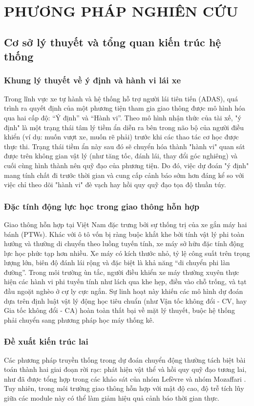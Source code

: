 \chapter{PHƯƠNG PHÁP NGHIÊN CỨU}
	\section{Cơ sở lý thuyết và tổng quan kiến trúc hệ thống}
	
	\subsection{Khung lý thuyết về ý định và hành vi lái xe}
	Trong lĩnh vực xe tự hành và hệ thống hỗ trợ người lái tiên tiến (ADAS), quá trình ra quyết định của một phương tiện tham gia giao thông được mô hình hóa qua hai cấp độ: ``Ý định'' và ``Hành vi''. 
	Theo mô hình nhận thức của tài xế, "ý định" là một trạng thái tâm lý tiềm ẩn diễn ra bên trong não bộ của người điều khiển (ví dụ: muốn vượt xe, muốn rẽ phải) trước khi các thao tác cơ học được thực thi. Trạng thái tiềm ẩn này sau đó sẽ chuyển hóa thành "hành vi" quan sát được trên không gian vật lý (như tăng tốc, đánh lái, thay đổi góc nghiêng) và cuối cùng hình thành nên quỹ đạo của phương tiện. Do đó, việc dự đoán "ý định" mang tính chất đi trước thời gian và cung cấp cảnh báo sớm hơn đáng kể so với việc chỉ theo dõi "hành vi" đè vạch hay hồi quy quỹ đạo tọa độ thuần túy.
	
	\subsection{Đặc tính động lực học trong giao thông hỗn hợp}
	Giao thông hỗn hợp tại Việt Nam đặc trưng bởi sự thống trị của xe gắn máy hai bánh (PTWs). Khác với ô tô vốn bị ràng buộc khắt khe bởi tính vật lý phi toàn hướng và thường di chuyển theo luồng tuyến tính, xe máy sở hữu đặc tính động lực học phức tạp hơn nhiều. 
	Xe máy có kích thước nhỏ, tỷ lệ công suất trên trọng lượng lớn, biên độ đánh lái rộng và đặc biệt là khả năng ``di chuyển phi làn đường''. Trong môi trường ùn tắc, người điều khiển xe máy thường xuyên thực hiện các hành vi phi tuyến tính như lách qua khe hẹp, điền vào chỗ trống, và tạt đầu ngoặt nghèo ở cự ly cực ngắn. Sự linh hoạt này khiến các mô hình dự đoán dựa trên định luật vật lý động học tiêu chuẩn (như Vận tốc không đổi - CV, hay Gia tốc không đổi - CA) hoàn toàn thất bại về mặt lý thuyết, buộc hệ thống phải chuyển sang phương pháp học máy thống kê.
	
	\subsection{Đề xuất kiến trúc lai}
	Các phương pháp truyền thống trong dự đoán chuyển động thường tách biệt bài toán thành hai giai đoạn rời rạc: phát hiện vật thể và hồi quy quỹ đạo tương lai, như đã được tổng hợp trong các khảo sát của nhóm Lefèvre \cite{Lefvre2014ASO} và nhóm Mozaffari \cite{Mozaffari2020DeepLV}. Tuy nhiên, trong môi trường giao thông hỗn hợp với mật độ cao, độ trễ tích lũy giữa các module này có thể làm giảm hiệu quả cảnh báo thời gian thực.
	
